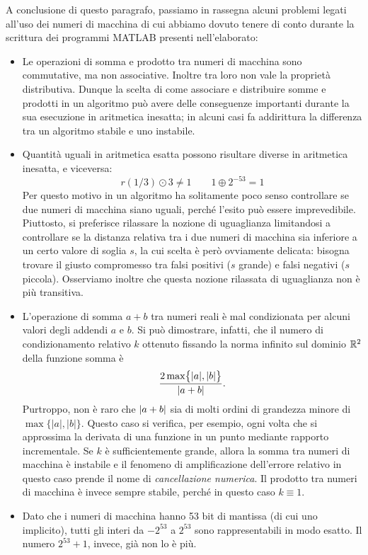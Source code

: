 A conclusione di questo paragrafo, passiamo in rassegna alcuni
problemi legati all'uso dei numeri di macchina di cui abbiamo
dovuto tenere di conto durante la scrittura dei programmi MATLAB
presenti nell'elaborato:
\begin{itemize}
\item Le operazioni di somma e prodotto tra numeri di macchina sono commutative,
	ma non associative. Inoltre tra loro non vale la proprietà distributiva.
	Dunque la scelta di come associare e distribuire somme e prodotti
	in un algoritmo può avere delle conseguenze importanti
	durante la sua esecuzione in aritmetica inesatta; in alcuni casi
	fa addirittura la differenza tra un algoritmo stabile e uno instabile.
\item Quantità uguali in aritmetica esatta possono risultare diverse
	in aritmetica inesatta, e viceversa:
	\[
	r(1/3) \odot 3 \neq 1
	\qquad 1 \oplus 2^{-53} = 1
	\]
	Per questo motivo in un algoritmo ha solitamente poco senso
	controllare se due numeri di macchina siano uguali, perché l'esito
	può essere imprevedibile. Piuttosto, si preferisce
	rilassare la nozione di uguaglianza limitandosi a controllare se
	la distanza relativa tra i due numeri di macchina sia inferiore a
	un certo valore di soglia $s$, la cui scelta è però ovviamente
	delicata: bisogna trovare il giusto compromesso tra falsi positivi
	($s$ grande) e falsi negativi ($s$ piccola). Osserviamo inoltre che
	questa nozione rilassata di uguaglianza non è più transitiva.
\item L'operazione di somma $a+b$ tra numeri reali è mal condizionata
	per alcuni valori degli addendi $a$ e $b$. Si può dimostrare,
	infatti, che il numero di condizionamento relativo $k$ ottenuto
	fissando la norma infinito sul dominio $\mathbb{R}^2$ della funzione somma è
	\[
	\frac{2 \max\bigl\{|a|,|b|\bigr\}}{\left\lvert a+b\right\rvert}.
	\]
	Purtroppo, non è raro che $\left\lvert a+b\right\rvert$ sia di molti
	ordini di grandezza minore di $\max\bigl\{|a|,|b|\bigr\}$.
	Questo caso si verifica, per esempio,
	ogni volta che si approssima la derivata di una funzione
	in un punto mediante rapporto incrementale.
	Se $k$ è sufficientemente grande, allora la somma tra numeri di macchina
	è instabile e il fenomeno di amplificazione dell'errore relativo
	in questo caso prende il nome di \emph{cancellazione numerica}.
	Il prodotto tra numeri di macchina è invece sempre stabile,
	perché in questo caso $k \equiv 1$.
\item Dato che i numeri di macchina hanno 53 bit di mantissa
	(di cui uno implicito), tutti gli interi da $-2^{53}$ a $2^{53}$
	sono rappresentabili in modo esatto.
	Il numero $2^{53}+1$, invece, già non lo è più.
\end{itemize}

